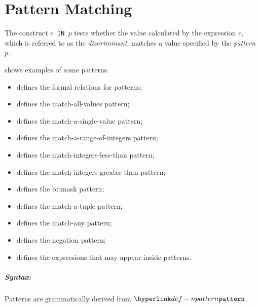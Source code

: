 \chapter{Pattern Matching\label{chap:PatternMatching}}

The construct \texttt{$e$ IN $p$} tests whether the value calculated by the expression $e$,
which is referred to as the \emph{discriminant},
matches a value specified by the \emph{pattern} $p$.

 shows examples of some patterns.

\ChapterOutline
\begin{itemize}
  \item {} defines the formal relations for patterns;
  \item {} defines the match-all-values pattern;
  \item {} defines the match-a-single-value pattern;
  \item {} defines the match-a-range-of-integers pattern;
  \item {} defines the match-integers-less-than pattern;
  \item {} defines the match-integers-greater-than pattern;
  \item {} defines the bitmask pattern;
  \item {} defines the match-a-tuple pattern;
  \item {} defines the match-any pattern;
  \item {} defines the negation pattern;
  \item {} defines the expressions that may appear inside patterns.
\end{itemize}

\paragraph{Syntax:} Patterns are grammatically derived from $\Npattern$.

